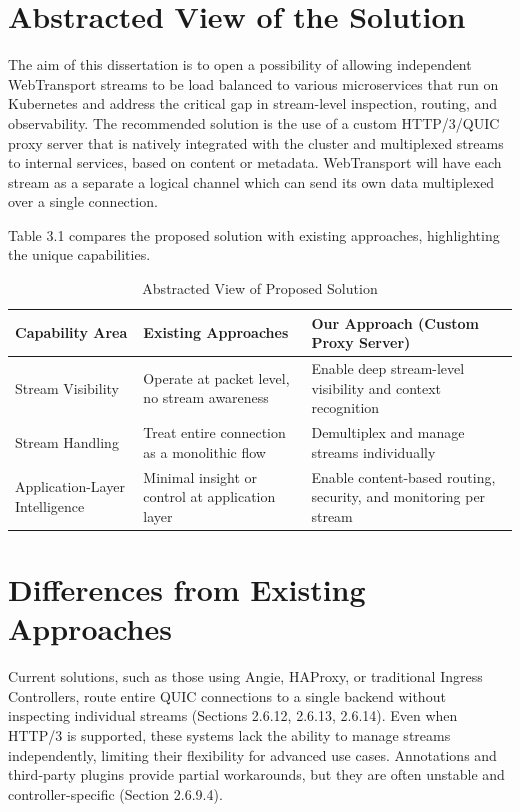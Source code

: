 {%
\section{Abstracted View of the Solution}


The aim of this dissertation is to open a possibility of allowing independent WebTransport streams to be load balanced to various microservices that run on Kubernetes and  address the critical gap in stream-level inspection, routing, and observability. The recommended solution is the use of a custom HTTP/3/QUIC proxy server that is natively integrated with the cluster and multiplexed streams to internal services, based on content or metadata. WebTransport will have each stream as a separate a logical channel which can send its own data multiplexed over a single connection.


Table 3.1 compares the proposed solution with existing approaches, highlighting the unique capabilities.

\begin{table}[h]
\centering
\caption{Abstracted View of Proposed Solution}
\begin{tabular}{|p{4cm}|p{5cm}|p{5cm}|}
\hline
\textbf{Capability Area} & \textbf{Existing Approaches} & \textbf{Our Approach (Custom Proxy Server)} \\
\hline
Stream Visibility & Operate at packet level, no stream awareness & Enable deep stream-level visibility and context recognition \\
\hline
Stream Handling & Treat entire connection as a monolithic flow & Demultiplex and manage streams individually \\
\hline
Application-Layer Intelligence & Minimal insight or control at application layer & Enable content-based routing, security, and monitoring per stream \\
\hline
\end{tabular}
\end{table}

\section{Differences from Existing Approaches}
Current solutions, such as those using Angie, HAProxy, or traditional Ingress Controllers, route entire QUIC connections to a single backend without inspecting individual streams (Sections 2.6.12, 2.6.13, 2.6.14). Even when HTTP/3 is supported, these systems lack the ability to manage streams independently, limiting their flexibility for advanced use cases. Annotations and third-party plugins provide partial workarounds, but they are often unstable and controller-specific (Section 2.6.9.4).

}
